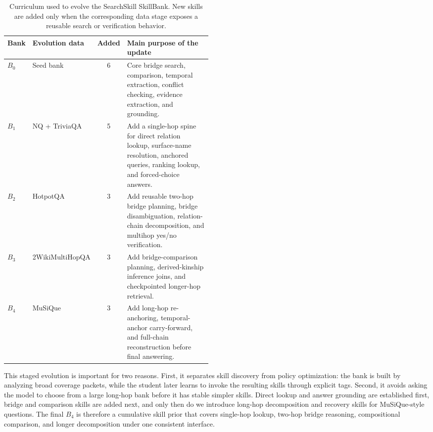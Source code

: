 \documentclass{article}
\begin{document}
\begin{table}[tbp]
  \centering
  \caption{Curriculum used to evolve the SearchSkill SkillBank. New skills are added only when the corresponding data stage exposes a reusable search or verification behavior.}
  \label{tab:appendix-skillbank-evolution}
  \setlength{\tabcolsep}{4pt}
  \renewcommand{\arraystretch}{1.12}
  \small
  \begin{tabular}{llcp{0.48\linewidth}}
    \toprule
    \textbf{Bank} & \textbf{Evolution data} & \textbf{Added} & \textbf{Main purpose of the update} \\
    \midrule
    \(B_0\) & Seed bank & 6 & Core bridge search, comparison, temporal extraction, conflict checking, evidence extraction, and grounding. \\
    \(B_1\) & NQ + TriviaQA & 5 & Add a single-hop spine for direct relation lookup, surface-name resolution, anchored queries, ranking lookup, and forced-choice answers. \\
    \(B_2\) & HotpotQA & 3 & Add reusable two-hop bridge planning, bridge disambiguation, relation-chain decomposition, and multihop yes/no verification. \\
    \(B_3\) & 2WikiMultiHopQA & 3 & Add bridge-comparison planning, derived-kinship inference joins, and checkpointed longer-hop retrieval. \\
    \(B_4\) & MuSiQue & 3 & Add long-hop re-anchoring, temporal-anchor carry-forward, and full-chain reconstruction before final answering. \\
    \bottomrule
  \end{tabular}
\end{table}

This staged evolution is important for two reasons. First, it separates skill discovery from policy optimization: the bank is built by analyzing broad coverage packets, while the student later learns to invoke the resulting skills through explicit tags. Second, it avoids asking the model to choose from a large long-hop bank before it has stable simpler skills. Direct lookup and answer grounding are established first, bridge and comparison skills are added next, and only then do we introduce long-hop decomposition and recovery skills for MuSiQue-style questions. The final \(B_4\) is therefore a cumulative skill prior that covers single-hop lookup, two-hop bridge reasoning, compositional comparison, and longer decomposition under one consistent interface.
\end{document}
